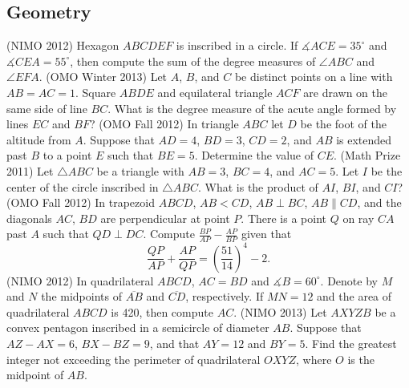 \documentclass[11pt]{scrartcl}
\begin{document}
\subsection{Geometry}
\begin{enumerate}[\bfseries {G}1.]
  \ii %
    (NIMO 2012) Hexagon $ABCDEF$ is inscribed in a circle.  If $\measuredangle ACE = 35^{\circ}$ and $\measuredangle CEA = 55^{\circ}$, then compute the sum of the degree measures of $\angle ABC$ and $\angle EFA$.
  \ii %
    (OMO Winter 2013) Let $A$, $B$, and $C$ be distinct points on a line with $AB=AC=1$. Square $ABDE$ and equilateral triangle $ACF$ are drawn on the same side of line $BC$. What is the degree measure of the acute angle formed by lines $EC$ and $BF$?
  \ii %
    (OMO Fall 2012) In triangle $ABC$ let $D$ be the foot of the altitude from $A$. Suppose that $AD = 4$, $BD = 3$, $CD = 2$, and $AB$ is extended past $B$ to a point $E$ such that $BE = 5$. Determine the value of $CE$.
  \ii %
    (Math Prize 2011) Let $\triangle ABC$ be a triangle with $AB = 3$, $BC = 4$, and $AC = 5$.  Let $I$ be the center of the circle inscribed in $\triangle ABC$.  What is the product of $AI$, $BI$, and $CI$?
  \ii %
    (OMO Fall 2012) In trapezoid $ABCD$, $AB < CD$, $AB\perp BC$, $AB\parallel CD$, and the diagonals $AC$, $BD$ are perpendicular at point $P$. There is a point $Q$ on ray $CA$ past $A$ such that $QD\perp DC$. Compute $\frac{BP}{AP} - \frac{AP}{BP}$ given that \[ \frac{QP} {AP}+\frac{AP} {QP} = \left( \frac{51}{14}\right)^4 - 2. \]
  \ii %
    (NIMO 2012) In quadrilateral $ABCD$, $AC = BD$ and $\measuredangle B = 60^\circ$. Denote by $M$ and $N$ the midpoints of $\overline{AB}$ and $\overline{CD}$, respectively. If $MN = 12$ and the area of quadrilateral $ABCD$ is 420, then compute $AC$.
  \ii %
    (NIMO 2013) Let $AXYZB$ be a convex pentagon inscribed in a semicircle of diameter $AB$.  Suppose that $AZ-AX=6$, $BX-BZ=9$, and that $AY=12$ and $BY=5$.  Find the greatest integer not exceeding the perimeter of quadrilateral $OXYZ$, where $O$ is the midpoint of $AB$.
\end{enumerate}
\end{document}
